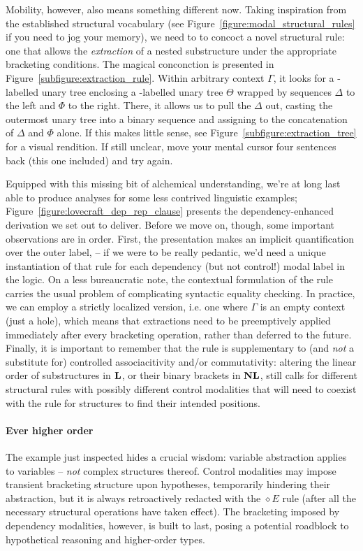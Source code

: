 Mobility, however, also means something different now.
Taking inspiration from the established structural vocabulary (see Figure~\ref{figure:modal_structural_rules} if you need to jog your memory), we need to  to concoct a novel structural rule: one that allows the \textit{extraction} of a nested substructure under the appropriate bracketing conditions.
The magical conconction is presented in Figure~\ref{subfigure:extraction_rule}.
Within arbitrary context $\Gamma$, it looks for a -labelled unary tree enclosing a -labelled unary tree $\Theta$ wrapped by sequences $\Delta$ to the left and $\Phi$ to the right.
There, it allows us to pull the $\Delta$ out, casting the outermost unary tree into a binary sequence and assigning  to the concatenation of $\Delta$ and $\Phi$ alone. 
If this makes little sense, see Figure~\ref{subfigure:extraction_tree} for a visual rendition.
If still unclear, move your mental cursor four sentences back (this one included) and try again.

Equipped with this missing bit of alchemical understanding, we're at long last able to produce analyses for some less contrived linguistic examples; Figure~\ref{figure:lovecraft_dep_rep_clause} presents the dependency-enhanced derivation we set out to deliver.
Before we move on, though, some important observations are in order.
First, the presentation makes an implicit quantification over the outer label,  -- if we were to be really pedantic, we'd need a unique instantiation of that rule for each dependency (but not control!) modal label in the logic.
On a less bureaucratic note, the contextual formulation of the rule carries the usual problem of complicating syntactic equality checking. 
In practice, we can employ a strictly localized version, i.e. one where $\Gamma$ is an empty context (just a hole), which means that extractions need to be preemptively applied immediately after every bracketing operation, rather than deferred to the future.
Finally, it is important to remember that the rule is supplementary to (and \textit{not} a substitute for) controlled associacitivity and/or commutativity: altering the linear order of substructures in $\textbf{L}$, or their binary brackets in $\textbf{NL}$, still calls for different structural rules with possibly different control modalities that will need to coexist with the \Extraction{} rule for structures to find their intended positions.


\paragraph{Ever higher order}
The example just inspected hides a crucial wisdom: variable abstraction applies to variables -- \textit{not} complex structures thereof.
Control modalities may impose transient bracketing structure upon hypotheses, temporarily hindering their abstraction, but it is always retroactively redacted with the $\diamond E$ rule (after all the necessary structural operations have taken effect).
The bracketing imposed by dependency modalities, however, is built to last, posing a potential roadblock to hypothetical reasoning and higher-order types.

